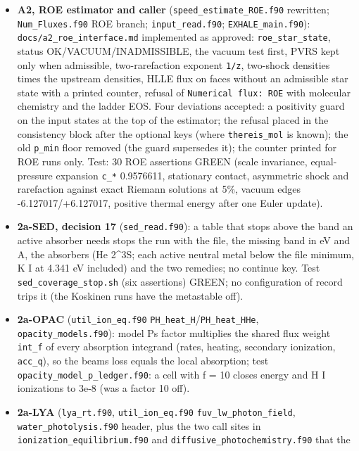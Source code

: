 \documentclass[english,a4paper]{my_memo}
\providecommand{\tightlist}{\setlength{\itemsep}{0pt}\setlength{\parskip}{0pt}}
\begin{document}
\begin{itemize}
\tightlist
\item
  \textbf{A2, ROE estimator and caller} (\texttt{speed\_estimate\_ROE.f90} rewritten;
  \texttt{Num\_Fluxes.f90} ROE branch; \texttt{input\_read.f90}; \texttt{EXHALE\_main.f90}):
  \texttt{docs/a2\_roe\_interface.md} implemented as approved: \texttt{roe\_star\_state},
  status OK/VACUUM/INADMISSIBLE, the vacuum test first, PVRS kept only when
  admissible, two-rarefaction exponent \texttt{1/z}, two-shock densities times the
  upstream densities, HLLE flux on faces without an admissible star state
  with a printed counter, refusal of \texttt{Numerical\ flux:\ ROE} with molecular
  chemistry and the ladder EOS. Four deviations accepted: a positivity guard
  on the input states at the top of the estimator; the refusal placed in the
  consistency block after the optional keys (where \texttt{thereis\_mol} is known);
  the old \texttt{p\_min} floor removed (the guard supersedes it); the counter printed
  for ROE runs only. Test: 30 ROE assertions GREEN (scale invariance,
  equal-pressure expansion \texttt{c\_*} 0.9576611, stationary contact, asymmetric
  shock and rarefaction against exact Riemann solutions at 5\%, vacuum edges
  -6.127017/+6.127017, positive thermal energy after one Euler update).
\item
  \textbf{2a-SED, decision 17} (\texttt{sed\_read.f90}): a table that stops above the
  band an active absorber needs stops the run with the file, the missing band
  in eV and A, the absorbers (He 2\^{}3S; each active neutral metal below the
  file minimum, K I at 4.341 eV included) and the two remedies; no continue
  key. Test \texttt{sed\_coverage\_stop.sh} (six assertions) GREEN; no configuration
  of record trips it (the Koskinen runs have the metastable off).
\item
  \textbf{2a-OPAC} (\texttt{util\_ion\_eq.f90} \texttt{PH\_heat\_H}/\texttt{PH\_heat\_HHe},
  \texttt{opacity\_models.f90}): model P\textquotesingle s factor multiplies the shared flux weight
  \texttt{int\_f} of every absorption integrand (rates, heating, secondary
  ionization, \texttt{acc\_q}), so the beam\textquotesingle s loss equals the local absorption;
  test \texttt{opacity\_model\_p\_ledger.f90}: a cell with f = 10 closes energy and
  H I ionizations to 3e-8 (was a factor 10 off).
\item
  \textbf{2a-LYA} (\texttt{lya\_rt.f90}, \texttt{util\_ion\_eq.f90} \texttt{fuv\_lw\_photon\_field},
  \texttt{water\_photolysis.f90} header, plus the two call sites in
  \texttt{ionization\_equilibrium.f90} and \texttt{diffusive\_photochemistry.f90} that the

\end{itemize}
\end{document}
